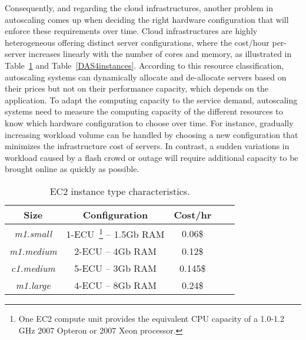 Consequently, and regarding the cloud infrastructures, another problem in autoscaling comes up when deciding the right hardware configuration that will enforce these requirements over time. Cloud infrastructures are highly heterogeneous offering distinct server configurations, where the cost/hour per-server increases linearly with the number of cores and memory, as illustrated in Table~\ref{EC2instances} and Table~\ref{DAS4instances}. According to this resource classification, autoscaling systems can dynamically allocate and de-allocate servers based on their prices but not on their performance capacity, which depends on the application. 
To adapt the computing capacity to the service demand, autoscaling systems need to measure the computing capacity of the different resources to know which hardware configuration to choose over time. For instance, gradually increasing workload volume can be handled by choosing a new configuration that minimizes the infrastructure cost of servers. In contrast, a sudden variations in workload caused by a flash crowd or outage will require additional capacity to be brought online as quickly as possible. 

\begin{table}
  {\scriptsize 
\begin{center}
    \begin{tabular}{  | c | c | c | c | c |}
    \hline
      \textbf{Size}  & \textbf{Configuration} & \textbf{Cost/hr} \\ \hline
   \textit{m1.small}   & 1-ECU~\footnote{One EC2 compute unit provides the equivalent CPU capacity of a 1.0-1.2 GHz 2007 Opteron or 2007 Xeon processor.}  -- 1.5Gb RAM&  0.06\$ \\ \hline
   \textit{m1.medium}   & 2-ECU -- 4Gb RAM&  0.12\$ \\ \hline
\textit{c1.medium} & 5-ECU -- 3Gb RAM& 0.145\$   \\ \hline
\textit{m1.large} & 4-ECU -- 8Gb RAM& 0.24\$   \\ \hline
 \end{tabular}
\end{center}
\vspace{-5mm}
\caption{EC2 instance type characteristics.}
\label{EC2instances}
}
\end{table}

